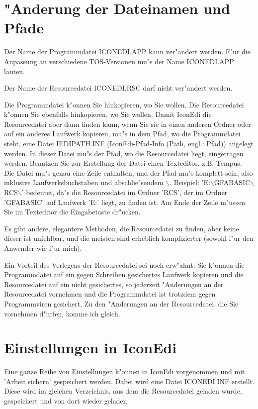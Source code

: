 \section{"Anderung der Dateinamen und Pfade} 
Der Name der Programmdatei ICONEDI.APP kann ver"andert werden. F"ur 
die Anpassung an verschiedene TOS-Versionen mu"s der Name ICONEDI.APP
lauten.

Der Name der Resourcedatei ICONEDI.RSC darf nicht ver"andert werden.

Die Programmdatei k"onnen Sie hinkopieren, wo Sie wollen. Die
Resourcedatei k"onnen Sie ebenfalls hinkopieren, wo Sie wollen.
Damit IconEdi die Resourcedatei aber dann finden kann, wenn Sie
sie in einen anderen Ordner oder auf ein anderes Laufwerk kopieren,
mu"s in dem Pfad, wo die Programmdatei steht, eine Datei IEDIPATH.INF
(IconEdi-Pfad-Info (Path, engl.: Pfad)) angelegt werden. In dieser
Datei mu"s der Pfad, wo die Resourcedatei liegt, eingetragen werden.
Benutzen Sie zur Erstellung der Datei einen Texteditor, z.B. Tempus.
Die Datei mu"s genau eine Zeile enthalten, und der Pfad mu"s 
komplett sein, also inklusive Laufwerksbuchstaben und abschlie"sendem
$\backslash$. Beispiel: 
'E:$\backslash$GFABASIC$\backslash$RCS$\backslash$' bedeutet,
da"s die Resourcedatei im Ordner 'RCS', der im Ordner 'GFABASIC'
auf Laufwerk 'E:' liegt, zu finden ist. Am Ende der Zeile m"ussen Sie
im Texteditor die Eingabetaste dr"ucken.

Es gibt andere, elegantere Methoden, die Resourcedatei zu finden, 
aber keine dieser ist unfehlbar, und die meisten sind erheblich 
komplizierter (sowohl f"ur den Anwender wie f"ur mich). 

Ein Vorteil des Verlegens der Resourcedatei sei noch erw"ahnt: Sie
k"onnen die Programmdatei auf ein gegen Schreiben gesichertes 
Laufwerk kopieren und die Resourcedatei auf ein nicht gesichertes,
so jederzeit "Anderungen an der Resourcedatei vornehmen und die
Programmdatei ist trotzdem gegen Programmviren gesichert. Zu den
"Anderungen an der Resourcedatei, die Sie vornehmen d"urfen, komme ich
gleich.

\section{Einstellungen in IconEdi}
Eine ganze Reihe von Einstellungen k"onnen in IconEdi vorgenommen 
und mit 'Arbeit sichern' gespeichert werden. Dabei wird eine Datei
ICONEDI.INF erstellt. Diese wird im gleichen Verzeichnis, aus dem
die Resourcedatei geladen wurde, gespeichert und von dort wieder 
geladen. 

